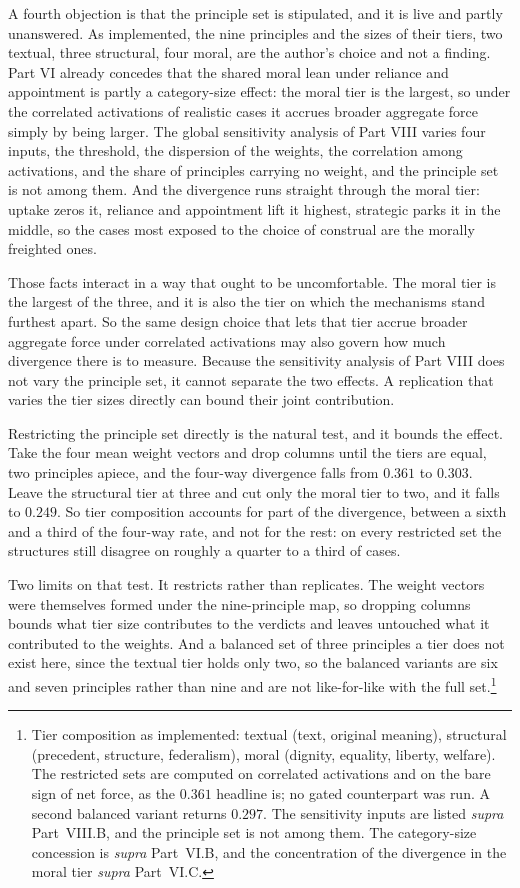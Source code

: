 A fourth objection is that the principle set is stipulated, and it is live and
partly unanswered. As implemented, the nine
principles and the sizes of their tiers, two textual, three structural,
four moral, are the author's choice and not a finding. Part VI already concedes that the
shared moral lean under reliance and appointment is partly a category-size
effect: the moral tier is the largest, so under the correlated
activations of realistic cases it accrues broader aggregate force simply
by being larger. The global sensitivity analysis of Part VIII varies four
inputs, the threshold, the dispersion of the weights, the correlation
among activations, and the share of principles carrying no weight, and
the principle set is not among them. And the divergence runs straight
through the moral tier: uptake zeros it, reliance and appointment lift it
highest, strategic parks it in the middle, so the cases most exposed to
the choice of construal are the morally freighted ones.

Those facts interact in a way that ought to be uncomfortable. The moral tier is the largest of the three, and it is also the tier on
which the mechanisms stand furthest apart. So the same design choice that lets that tier accrue broader aggregate
force under correlated activations may also govern how much divergence
there is to measure. Because the sensitivity analysis of Part VIII does not
vary the principle set, it cannot separate the two effects. A replication that
varies the tier sizes directly can bound their joint contribution.

Restricting the principle set directly is the natural test, and it bounds the
effect. Take the four mean weight vectors and drop columns until the tiers are
equal, two principles apiece, and the four-way divergence falls from $0.361$
to $0.303$. Leave the structural tier at three and cut only the moral tier to
two, and it falls to $0.249$. So tier composition accounts for part of the
divergence, between a sixth and a third of the four-way rate, and not for the
rest: on every restricted set the structures still disagree on roughly a
quarter to a third of cases.

Two limits on that test. It restricts rather than replicates. The weight
vectors were themselves formed under the nine-principle map, so dropping
columns bounds what tier size contributes to the verdicts and leaves untouched
what it contributed to the weights. And a balanced set of three principles a
tier does not exist here, since the textual tier holds only two, so the
balanced variants are six and seven principles rather than nine and are not
like-for-like with the full set.\footnote{Tier composition as implemented:
textual (text, original meaning), structural (precedent, structure,
federalism), moral (dignity, equality, liberty, welfare). The restricted sets
are computed on correlated activations and on the bare sign of net force, as
the $0.361$ headline is; no gated counterpart was run. A second balanced
variant returns $0.297$. The sensitivity inputs are listed \textit{supra}
Part~VIII.B, and the principle set is not among them. The category-size
concession is \textit{supra} Part~VI.B, and the concentration of the
divergence in the moral tier \textit{supra} Part~VI.C.}

